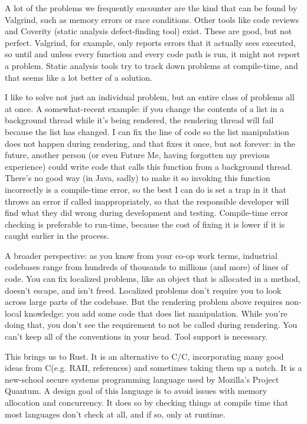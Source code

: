 \documentclass[a4paper]{report}
\newcommand{\CPP}{C\nolinebreak\hspace{-.05em}\raisebox{.4ex}{\tiny\bf +}\nolinebreak\hspace{-.10em}\raisebox{.4ex}{\tiny\bf +}}
\def\CPP{{C\nolinebreak[4]\hspace{-.05em}\raisebox{.4ex}{\tiny\bf ++}}}
\begin{document}
A lot of the problems we frequently encounter are the kind that can be found by Valgrind, such as memory errors or race conditions. Other tools like code reviews and Coverity (static analysis defect-finding tool) exist. These are good, but not perfect. Valgrind, for example, only reports errors that it actually sees executed, so until and unless every function and every code path is run, it might not report a problem. Static analysis tools try to track down problems at compile-time, and that seems like a lot better of a solution.

I like to solve not just an individual problem, but an entire class of problems all at once. A somewhat-recent example: if you change the contents of a list in a background thread while it's being rendered, the rendering thread will fail because the list has changed. I can fix the line of code so the list manipulation does not happen during rendering, and that fixes it once, but not forever: in the future, another person (or even Future Me, having forgotten my previous experience) could write code that calls this function from a background thread. There's no good way (in Java, sadly) to make it so invoking this function incorrectly is a compile-time error, so the best I can do is set a trap in it that throws an error if called inappropriately, so that the responsible developer will find what they did wrong during development and testing. Compile-time error checking is preferable to run-time, because the cost of fixing it is lower if it is caught earlier in the process.

A broader perspective: as you know from your co-op work terms, industrial codebases range from hundreds of thousands to millions (and more) of lines of code. You can fix localized problems, like an object that is allocated in a method, doesn't escape, and isn't freed. Localized problems don't require you to look across large parts of the codebase. But the rendering problem above requires non-local knowledge: you add some code that does list manipulation. While you're doing that, you don't see the requirement to not be called during rendering. You can't keep all of the conventions in your head. Tool support is necessary.

This brings us to Rust. It is an alternative to C/\CPP, incorporating many good ideas from \CPP (e.g. RAII, references) and sometimes taking them up a notch. It is a new-school
secure systems programming language used by Mozilla's Project Quantum. A design goal of this language is to avoid issues with memory allocation and concurrency. It does so by checking things at compile time that most languages don't check at all, and if so, only at runtime.
\end{document}
